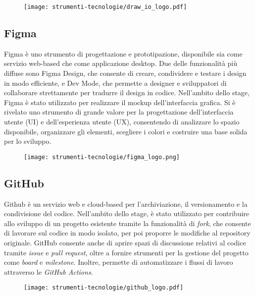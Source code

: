 \begin{figure}[H]
    \centering 
    \texttt{[image: strumenti-tecnologie/draw\_io\_logo.pdf]} 
\end{figure}

\subsection*{Figma}

\par Figma è uno strumento di progettazione e prototipazione, disponibile sia come servizio web-based che come applicazione desktop. Due delle funzionalità più diffuse sono Figma Design, che consente di creare, condividere e testare i design in modo efficiente, e Dev Mode, che permette a designer e sviluppatori di collaborare strettamente per tradurre il design in codice. Nell’ambito dello stage, Figma è stato utilizzato per realizzare il mockup dell’interfaccia grafica. Si è rivelato uno strumento di grande valore per la progettazione dell'interfaccia utente (UI) e dell’esperienza utente (UX), consentendo di analizzare lo spazio disponibile, organizzare gli elementi, scegliere i colori e costruire una base solida per lo sviluppo.

\begin{figure}[H]
    \centering 
    \texttt{[image: strumenti-tecnologie/figma\_logo.png]} 
\end{figure}

\subsection*{GitHub}

\par Github è un servizio web e cloud-based per l'archiviazione, il versionamento e la condivisione del codice. Nell’ambito dello stage, è stato utilizzato per contribuire allo sviluppo di un progetto esistente tramite la funzionalità di \textit{fork}, che consente di lavorare sul codice in modo isolato, per poi proporre le modifiche al repository originale. GitHub consente anche di aprire spazi di discussione relativi al codice tramite \textit{issue} e \textit{pull request}, oltre a fornire strumenti per la gestione del progetto come \textit{board} e \textit{milestone}. Inoltre, permette di automatizzare i flussi di lavoro attraverso le \textit{GitHub Actions}.

\begin{figure}[H]
    \centering 
    \texttt{[image: strumenti-tecnologie/github\_logo.pdf]} 
\end{figure}

